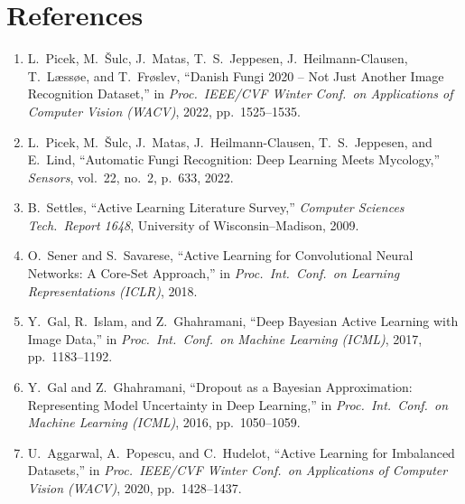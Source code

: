 \documentclass[11pt]{article}
\begin{document}
\section*{References}

\begin{singlespace}
\small
\begin{enumerate}[leftmargin=2em,itemsep=2pt]

\item L.~Picek, M.~\v{S}ulc, J.~Matas, T.~S.~Jeppesen, J.~Heilmann-Clausen,
T.~L\ae{}ss\o{}e, and T.~Fr\o{}slev,
``Danish Fungi 2020 -- Not Just Another Image Recognition Dataset,''
in \emph{Proc.\ IEEE/CVF Winter Conf.\ on Applications of Computer Vision (WACV)},
2022, pp.\ 1525--1535.

\item L.~Picek, M.~\v{S}ulc, J.~Matas, J.~Heilmann-Clausen, T.~S.~Jeppesen, and
E.~Lind, ``Automatic Fungi Recognition: Deep Learning Meets Mycology,''
\emph{Sensors}, vol.\ 22, no.\ 2, p.\ 633, 2022.

\item B.~Settles, ``Active Learning Literature Survey,''
\emph{Computer Sciences Tech.\ Report 1648}, University of
Wisconsin--Madison, 2009.

\item O.~Sener and S.~Savarese, ``Active Learning for Convolutional Neural
Networks: A Core-Set Approach,'' in \emph{Proc.\ Int.\ Conf.\ on Learning
Representations (ICLR)}, 2018.

\item Y.~Gal, R.~Islam, and Z.~Ghahramani, ``Deep Bayesian Active Learning
with Image Data,'' in \emph{Proc.\ Int.\ Conf.\ on Machine Learning (ICML)},
2017, pp.\ 1183--1192.

\item Y.~Gal and Z.~Ghahramani,
``Dropout as a Bayesian Approximation: Representing Model Uncertainty in
Deep Learning,'' in \emph{Proc.\ Int.\ Conf.\ on Machine Learning (ICML)},
2016, pp.\ 1050--1059.

\item U.~Aggarwal, A.~Popescu, and C.~Hudelot,
``Active Learning for Imbalanced Datasets,''
in \emph{Proc.\ IEEE/CVF Winter Conf.\ on Applications of Computer Vision (WACV)},
2020, pp.\ 1428--1437.

\end{enumerate}
\end{singlespace}
\end{document}

